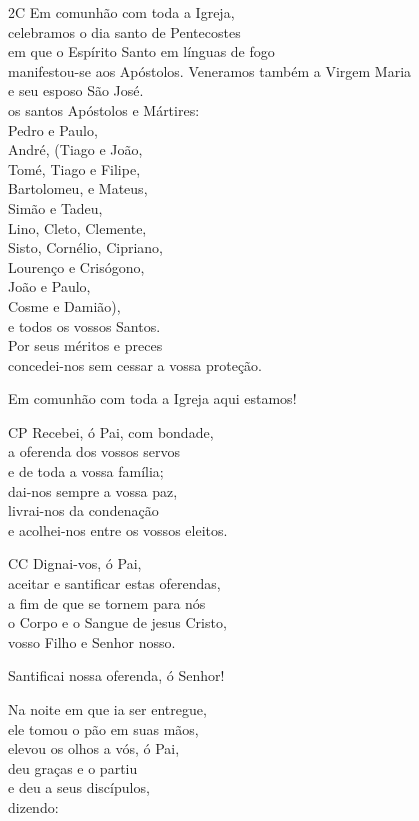 \documentclass{book}
\begin{document}
\begin{flushleft}
    2C Em comunhão com toda a Igreja, \\
    celebramos o dia santo de Pentecostes \\
    em que o Espírito Santo em línguas de fogo \\
    manifestou-se aos Apóstolos.
    Veneramos também a Virgem Maria \\
    e seu esposo São José. \\
    os santos Apóstolos e Mártires: \\
    Pedro e Paulo, \\
    André, (Tiago e João, \\
    Tomé, Tiago e Filipe, \\
    Bartolomeu, e Mateus, \\
    Simão e Tadeu, \\
    Lino, Cleto, Clemente, \\
    Sisto, Cornélio, Cipriano, \\
    Lourenço e Crisógono, \\
    João e Paulo, \\
    Cosme e Damião), \\
    e todos os vossos Santos. \\
    Por seus méritos e preces \\
    concedei-nos sem cessar a vossa proteção.

    Em comunhão com toda a Igreja aqui estamos!

    CP Recebei, ó Pai, com bondade, \\
    a oferenda dos vossos servos \\
    e de toda a vossa família; \\
    dai-nos sempre a vossa paz, \\
    livrai-nos da condenação \\
    e acolhei-nos entre os vossos eleitos.

    CC Dignai-vos, ó Pai, \\
    aceitar e santificar estas oferendas, \\
    a fim de que se tornem para nós \\
    o Corpo e o Sangue de jesus Cristo, \\
    vosso Filho e Senhor nosso.

    Santificai nossa oferenda, ó Senhor!

    Na noite em que ia ser entregue, \\
    ele tomou o pão em suas mãos, \\
    elevou os olhos a vós, ó Pai, \\
    deu graças e o partiu \\
    e deu a seus discípulos, \\
    dizendo:


\end{flushleft}
\end{document}
